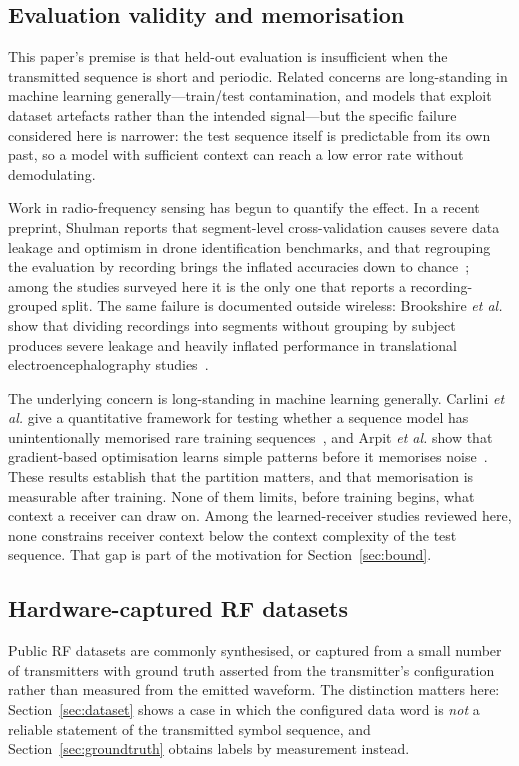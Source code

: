 \documentclass{ieeeaccess}
\begin{document}
\subsection{Evaluation validity and memorisation}
This paper's premise is that held-out evaluation is insufficient when the
transmitted sequence is short and periodic. Related concerns are long-standing
in machine learning generally---train/test contamination, and models that
exploit dataset artefacts rather than the intended signal---but the specific
failure considered here is narrower: the test sequence itself is predictable
from its own past, so a model with sufficient context can reach a low error rate
without demodulating.

Work in radio-frequency sensing has begun to quantify the effect. In a recent
preprint, Shulman reports that segment-level cross-validation causes severe
data leakage and optimism in drone identification benchmarks, and that
regrouping the evaluation by recording brings the inflated accuracies down to
chance~\cite{shulman2026rfdronebenchmarksoverstate}; among the studies
surveyed here it is the only one that reports a recording-grouped split. The
same failure is documented outside wireless: Brookshire \textit{et al.} show
that dividing recordings into segments without grouping by subject produces
severe leakage and heavily inflated performance in translational
electroencephalography studies~\cite{brook2024dataLeakage}.

The underlying concern is long-standing in machine learning generally. Carlini
\textit{et al.} give a quantitative framework for testing whether a sequence
model has unintentionally memorised rare training
sequences~\cite{nicolas2019secretSharer}, and Arpit \textit{et al.} show that
gradient-based optimisation learns simple patterns before it memorises
noise~\cite{arpit2017memorizationinDL}. These results establish that the
partition matters, and that memorisation is measurable after training. None of
them limits, before training begins, what context a receiver can draw on.
Among the learned-receiver studies reviewed here, none constrains receiver
context below the context complexity of the test sequence. That gap is part of
the motivation for Section~\ref{sec:bound}.

\subsection{Hardware-captured RF datasets}
Public RF datasets are commonly synthesised, or captured from a small number of
transmitters with ground truth asserted from the transmitter's configuration
rather than measured from the emitted waveform. The distinction matters here:
Section~\ref{sec:dataset} shows a case in which the configured data word is
\emph{not} a reliable statement of the transmitted symbol sequence, and
Section~\ref{sec:groundtruth} obtains labels by measurement instead.
\end{document}
